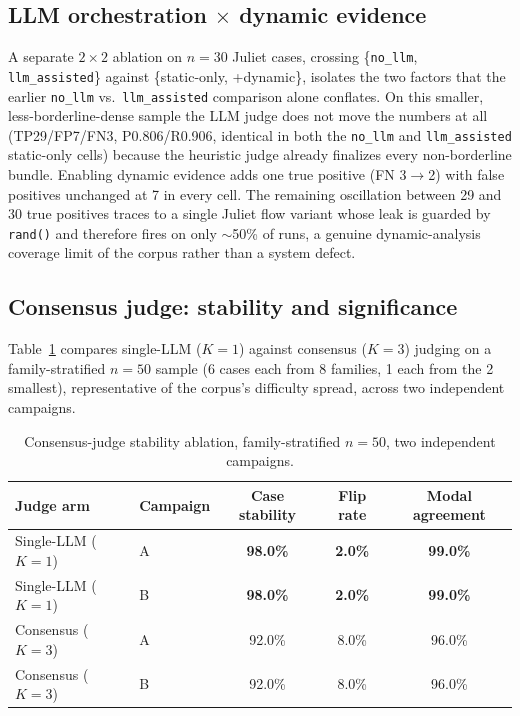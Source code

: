\documentclass[11pt,a4paper]{article}
\begin{document}
\subsection{LLM orchestration $\times$ dynamic evidence}

A separate $2\times2$ ablation on $n{=}30$ Juliet cases, crossing
\{\texttt{no\_llm}, \texttt{llm\_assisted}\} against \{static-only,
+dynamic\}, isolates the two factors that the earlier \texttt{no\_llm}
vs.\ \texttt{llm\_assisted} comparison alone conflates. On this smaller,
less-borderline-dense sample the LLM judge does not move the numbers at
all (TP29/FP7/FN3, P0.806/R0.906, identical in both the \texttt{no\_llm}
and \texttt{llm\_assisted} static-only cells) because the heuristic judge
already finalizes every non-borderline bundle. Enabling dynamic evidence
adds one true positive (FN 3$\to$2) with false positives unchanged at 7 in
every cell. The remaining oscillation between 29 and 30 true positives
traces to a single Juliet flow variant whose leak is guarded by
\texttt{rand()} and therefore fires on only $\sim$50\% of runs, a
genuine dynamic-analysis coverage limit of the corpus rather than a system defect.

\subsection{Consensus judge: stability and significance}
\label{sec:eval-consensus}

Table~\ref{tab:consensus} compares single-LLM ($K{=}1$) against consensus
($K{=}3$) judging on a family-stratified $n{=}50$ sample (6 cases each from
8 families, 1 each from the 2 smallest), representative of the corpus's
difficulty spread, across two independent campaigns.

\begin{table}[htbp]
\centering
\caption{Consensus-judge stability ablation, family-stratified $n{=}50$,
two independent campaigns.}
\label{tab:consensus}
\small
\begin{tabular}{@{}llccc@{}}
\toprule
\textbf{Judge arm} & \textbf{Campaign} & \textbf{Case stability} & \textbf{Flip rate} & \textbf{Modal agreement} \\
\midrule
Single-LLM ($K{=}1$) & A & \textbf{98.0\%} & \textbf{2.0\%} & \textbf{99.0\%} \\
Single-LLM ($K{=}1$) & B & \textbf{98.0\%} & \textbf{2.0\%} & \textbf{99.0\%} \\
Consensus ($K{=}3$) & A & 92.0\% & 8.0\% & 96.0\% \\
Consensus ($K{=}3$) & B & 92.0\% & 8.0\% & 96.0\% \\
\bottomrule
\end{tabular}
\end{table}
\end{document}
